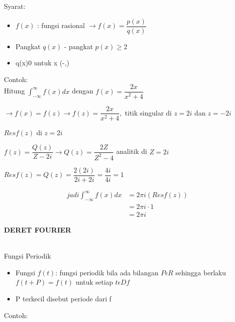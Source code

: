 \documentclass{article}
\begin{document}
Syarat:
\begin{itemize}
    \item $f(x)$ : fungsi rasional $\rightarrow f(x)=\dfrac{p(x)}{q(x)}$
    \item Pangkat $q(x)$ - pangkat $p(x) \ge 2$
    \item q(x)0 untuk x  (-,)
\end{itemize}

Contoh:\\

Hitung $\int_{- \infty}^{\infty} f(x)dx$ dengan $f(x) = \dfrac{2x}{x^2+4}$

$\rightarrow f(x) = f(z) \rightarrow f(z)=\dfrac{2x}{x^2+4},$ titik singular di $z = 2i$ dan $z = -2i$

$Res f(z)$ di $z = 2i$

$f(z)=\dfrac{Q(z)}{Z-2i} \rightarrow Q(z)=\dfrac{2Z}{Z^2-4}$ analitik di $Z = 2i$

$Res f(z) = Q(z)=\dfrac{2(2i)}{2i+2i} = \dfrac{4i}{4i} = 1$

\begin{align}
    jadi \int_{- \infty}^{\infty} f(x)dx & = 2\pi i (Res f(z))
    \nonumber                                                  \\
                                         & = 2\pi i \cdot 1
    \nonumber                                                  \\
                                         & = 2\pi i
    \nonumber
\end{align}



\newpage
\begin{center}
    \textbf{DERET FOURIER}
\end{center}
\leavevmode\\

Fungsi Periodik
\begin{itemize}
    \item Fungsi $f(t)$: fungsi periodik bila ada bilangan $P \epsilon R$ sehingga berlaku $f(t+P) = f(t)$ untuk setiap $t \epsilon Df$
    \item P terkecil disebut periode dari f
\end{itemize}

Contoh:
\end{document}
